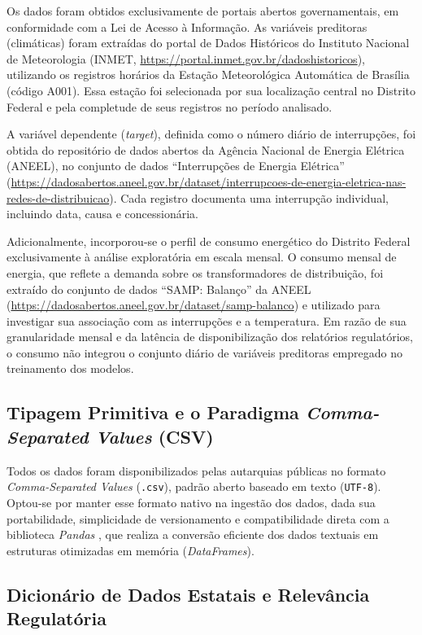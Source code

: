 Os dados foram obtidos exclusivamente de portais abertos governamentais, em conformidade com a Lei de Acesso à Informação. As variáveis preditoras (climáticas) foram extraídas do portal de Dados Históricos do Instituto Nacional de Meteorologia (INMET, \url{https://portal.inmet.gov.br/dadoshistoricos}), utilizando os registros horários da Estação Meteorológica Automática de Brasília (código A001). Essa estação foi selecionada por sua localização central no Distrito Federal e pela completude de seus registros no período analisado.

A variável dependente (\textit{target}), definida como o número diário de interrupções, foi obtida do repositório de dados abertos da Agência Nacional de Energia Elétrica (ANEEL), no conjunto de dados ``Interrupções de Energia Elétrica'' (\sloppy\url{https://dadosabertos.aneel.gov.br/dataset/interrupcoes-de-energia-eletrica-nas-redes-de-distribuicao}\fussy). Cada registro documenta uma interrupção individual, incluindo data, causa e concessionária.

Adicionalmente, incorporou-se o perfil de consumo energético do Distrito Federal exclusivamente à análise exploratória em escala mensal. O consumo mensal de energia, que reflete a demanda sobre os transformadores de distribuição, foi extraído do conjunto de dados ``SAMP: Balanço'' da ANEEL (\sloppy\url{https://dadosabertos.aneel.gov.br/dataset/samp-balanco}\fussy) e utilizado para investigar sua associação com as interrupções e a temperatura. Em razão de sua granularidade mensal e da latência de disponibilização dos relatórios regulatórios, o consumo não integrou o conjunto diário de variáveis preditoras empregado no treinamento dos modelos.
\subsection{Tipagem Primitiva e o Paradigma \textit{Comma-Separated Values} (CSV)}

Todos os dados foram disponibilizados pelas autarquias públicas no formato \textit{Comma-Separated Values} (\texttt{.csv}), padrão aberto baseado em texto (\texttt{UTF-8}). Optou-se por manter esse formato nativo na ingestão dos dados, dada sua portabilidade, simplicidade de versionamento e compatibilidade direta com a biblioteca \textit{Pandas} \cite{mckinney2010data}, que realiza a conversão eficiente dos dados textuais em estruturas otimizadas em memória (\textit{DataFrames}).

\subsection{Dicionário de Dados Estatais e Relevância Regulatória}

